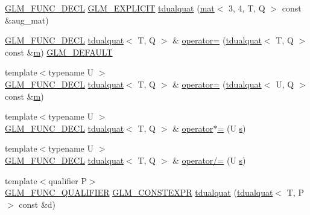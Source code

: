 \begin{DoxyCompactItemize}
\item 
\mbox{\hyperlink{setup_8hpp_ab2d052de21a70539923e9bcbf6e83a51}{G\+L\+M\+\_\+\+F\+U\+N\+C\+\_\+\+D\+E\+CL}} \mbox{\hyperlink{setup_8hpp_a6c74f5a5e7b134ab69023ff9a30d4d5d}{G\+L\+M\+\_\+\+E\+X\+P\+L\+I\+C\+IT}} \mbox{\hyperlink{structglm_1_1tdualquat_a3f557639a4737d4852919fdbbb39e133}{tdualquat}} (\mbox{\hyperlink{structglm_1_1mat}{mat}}$<$ 3, 4, T, Q $>$ const \&aug\+\_\+mat)
\item 
\mbox{\hyperlink{setup_8hpp_ab2d052de21a70539923e9bcbf6e83a51}{G\+L\+M\+\_\+\+F\+U\+N\+C\+\_\+\+D\+E\+CL}} \mbox{\hyperlink{structglm_1_1tdualquat}{tdualquat}}$<$ T, Q $>$ \& \mbox{\hyperlink{structglm_1_1tdualquat_a87cbf5213f512c3b14d9fb53e3314aa8}{operator=}} (\mbox{\hyperlink{structglm_1_1tdualquat}{tdualquat}}$<$ T, Q $>$ const \&\mbox{\hyperlink{_s_d_l__opengl__glext_8h_af593500c283bf1a787a6f947f503a5c2}{m}}) \mbox{\hyperlink{setup_8hpp_aefce7051c376a64ba89fa93a9f63bc2c}{G\+L\+M\+\_\+\+D\+E\+F\+A\+U\+LT}}
\item 
{\footnotesize template$<$typename U $>$ }\\\mbox{\hyperlink{setup_8hpp_ab2d052de21a70539923e9bcbf6e83a51}{G\+L\+M\+\_\+\+F\+U\+N\+C\+\_\+\+D\+E\+CL}} \mbox{\hyperlink{structglm_1_1tdualquat}{tdualquat}}$<$ T, Q $>$ \& \mbox{\hyperlink{structglm_1_1tdualquat_aa657c3d88bec1eff0cb387db5d180c15}{operator=}} (\mbox{\hyperlink{structglm_1_1tdualquat}{tdualquat}}$<$ U, Q $>$ const \&\mbox{\hyperlink{_s_d_l__opengl__glext_8h_af593500c283bf1a787a6f947f503a5c2}{m}})
\item 
{\footnotesize template$<$typename U $>$ }\\\mbox{\hyperlink{setup_8hpp_ab2d052de21a70539923e9bcbf6e83a51}{G\+L\+M\+\_\+\+F\+U\+N\+C\+\_\+\+D\+E\+CL}} \mbox{\hyperlink{structglm_1_1tdualquat}{tdualquat}}$<$ T, Q $>$ \& \mbox{\hyperlink{structglm_1_1tdualquat_ac2a4ef8f0875deefefae629a274efa6e}{operator$\ast$=}} (U \mbox{\hyperlink{_s_d_l__opengl_8h_a4af680a6c683f88ed67b76f207f2e6e4}{s}})
\item 
{\footnotesize template$<$typename U $>$ }\\\mbox{\hyperlink{setup_8hpp_ab2d052de21a70539923e9bcbf6e83a51}{G\+L\+M\+\_\+\+F\+U\+N\+C\+\_\+\+D\+E\+CL}} \mbox{\hyperlink{structglm_1_1tdualquat}{tdualquat}}$<$ T, Q $>$ \& \mbox{\hyperlink{structglm_1_1tdualquat_a608f6681fbff3ab120235c75aac8805b}{operator/=}} (U \mbox{\hyperlink{_s_d_l__opengl_8h_a4af680a6c683f88ed67b76f207f2e6e4}{s}})
\item 
{\footnotesize template$<$qualifier P$>$ }\\\mbox{\hyperlink{setup_8hpp_a33fdea6f91c5f834105f7415e2a64407}{G\+L\+M\+\_\+\+F\+U\+N\+C\+\_\+\+Q\+U\+A\+L\+I\+F\+I\+ER}} \mbox{\hyperlink{setup_8hpp_a08b807947b47031d3a511f03f89645ad}{G\+L\+M\+\_\+\+C\+O\+N\+S\+T\+E\+X\+PR}} \mbox{\hyperlink{structglm_1_1tdualquat_a9dbf71289809c7b43527c0e881601fbb}{tdualquat}} (\mbox{\hyperlink{structglm_1_1tdualquat}{tdualquat}}$<$ T, P $>$ const \&d)

\end{DoxyCompactItemize}
